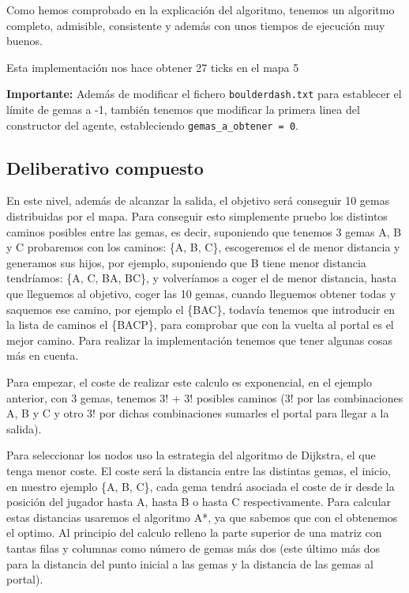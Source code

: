 \documentclass[10pt, spanish]{article}
\begin{document}
Como hemos comprobado en la explicación del algoritmo, tenemos un algoritmo completo, admisible, consistente y además con unos tiempos de ejecución muy buenos.



Esta implementación nos hace obtener 27 ticks en el mapa 5

\textbf{Importante:} Además de modificar el fichero \texttt{boulderdash.txt} para establecer el límite de gemas a -1, también tenemos que modificar la primera linea del constructor del agente, estableciendo \texttt{gemas\_a\_obtener = 0}.

\subsection{Deliberativo compuesto}

En este nivel, además de alcanzar la salida, el objetivo será conseguir 10 gemas distribuidas por el mapa. Para conseguir esto simplemente pruebo los distintos caminos posibles entre las gemas, es decir, suponiendo que tenemos 3 gemas A, B y C probaremos con los caminos: \{A, B, C\}, escogeremos el de menor distancia y generamos sus hijos, por ejemplo, suponiendo que B tiene menor distancia tendríamos: \{A, C, BA, BC\}, y volveríamos a coger el de menor distancia, hasta que lleguemos al objetivo, coger las 10 gemas, cuando lleguemos obtener todas y saquemos ese camino, por ejemplo el \{BAC\}, todavía tenemos que introducir en la lista de caminos el \{BACP\}, para comprobar que con la vuelta al portal es el mejor camino. Para realizar la implementación tenemos que tener algunas cosas más en cuenta.

Para empezar, el coste de realizar este calculo es exponencial, en el ejemplo anterior, con 3 gemas, tenemos 3! + 3! posibles caminos (3! por las combinaciones A, B y C y otro 3! por dichas combinaciones sumarles el portal para llegar a la salida).

Para seleccionar los nodos uso la estrategia del algoritmo de Dijkstra, el que tenga menor coste. El coste será la distancia entre las distintas gemas, el inicio, en nuestro ejemplo \{A, B, C\}, cada gema tendrá asociada el coste de ir desde la posición del jugador hasta A, hasta B o hasta C respectivamente. Para calcular estas distancias usaremos el algoritmo A*, ya que sabemos que con el obtenemos el optimo. Al principio del calculo relleno la parte superior de una matriz con tantas filas y columnas como número de gemas más dos (este último más dos para la distancia del punto inicial a las gemas y la distancia de las gemas al portal).
\end{document}
